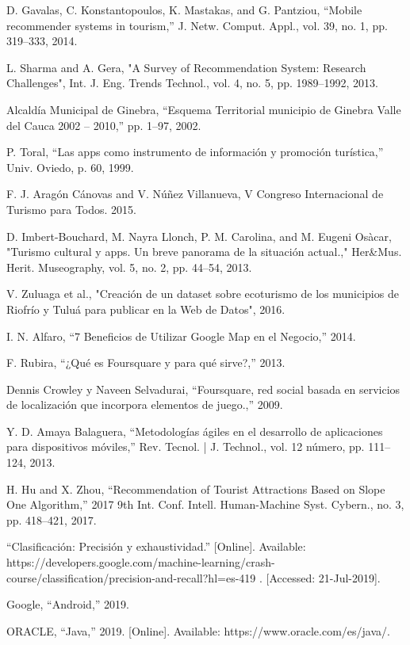 \documentclass[12pt,letterpaper,openany]{book}
\begin{document}
\begin{thebibliography}{1}
 D. Gavalas, C. Konstantopoulos, K. Mastakas, and G. Pantziou, “Mobile recommender systems in tourism,” J. Netw. Comput. Appl., vol. 39, no. 1, pp. 319–333, 2014.

 L. Sharma and A. Gera, "A Survey of Recommendation System: Research Challenges", Int. J. Eng. Trends Technol., vol. 4, no. 5, pp. 1989–1992, 2013.

 Alcaldía Municipal de Ginebra, “Esquema Territorial municipio de Ginebra Valle del Cauca 2002 – 2010,” pp. 1–97, 2002.

 P. Toral, “Las apps como instrumento de información y promoción turística,” Univ. Oviedo, p. 60, 1999.

 F. J. Aragón Cánovas and V. Núñez Villanueva, V Congreso Internacional de Turismo para Todos. 2015.

 D. Imbert-Bouchard, M. Nayra Llonch, P. M. Carolina, and M. Eugeni Osàcar, "Turismo cultural y apps. Un breve panorama de la situación actual.," Her\&Mus. Herit. Museography, vol. 5, no. 2, pp. 44–54, 2013.

 V. Zuluaga et al., "Creación de un dataset sobre ecoturismo de los municipios de Riofrío y Tuluá para publicar en la Web de Datos", 2016.

 I. N. Alfaro, “7 Beneficios de Utilizar Google Map en el Negocio,” 2014.

 F. Rubira, “¿Qué es Foursquare y para qué sirve?,” 2013. 

 Dennis Crowley y Naveen Selvadurai, “Foursquare, red social basada en servicios de localización que incorpora elementos de juego.,” 2009.

 Y. D. Amaya Balaguera, “Metodologías ágiles en el desarrollo de aplicaciones para dispositivos móviles,” Rev. Tecnol. | J. Technol., vol. 12 número, pp. 111–124, 2013.

 H. Hu and X. Zhou, “Recommendation of Tourist Attractions Based on Slope One Algorithm,” 2017 9th Int. Conf. Intell. Human-Machine Syst. Cybern., no. 3, pp. 418–421, 2017.

 “Clasificación: Precisión y exhaustividad.” [Online]. Available: https://developers.google.com/machine-learning/crash-course/classification/precision-and-recall?hl=es-419 . [Accessed: 21-Jul-2019].

 Google, “Android,” 2019.

 ORACLE, “Java,” 2019. [Online]. Available: https://www.oracle.com/es/java/.


\end{thebibliography}
\end{document}
